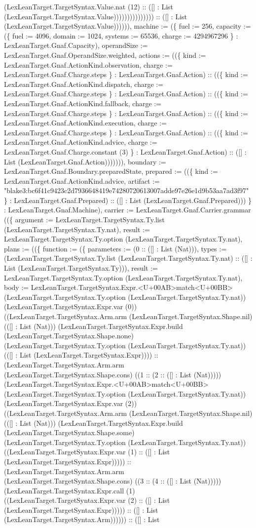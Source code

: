 \documentclass[11pt]{article}
\begin{document}
(LexLeanTarget.TargetSyntax.Value.nat (12) :: ([] : List (LexLeanTarget.TargetSyntax.Value))))))))))))))) :: ([] : List (LexLeanTarget.TargetSyntax.Value)))))), machine := (\{ fuel := 256, capacity := (\{ fuel := 4096, domain := 1024, systems := 65536, charge := 4294967296 \} : LexLeanTarget.Gnaf.Capacity), operandSize := LexLeanTarget.Gnaf.OperandSize.weighted, actions := ((\{ kind := LexLeanTarget.Gnaf.ActionKind.observation, charge := LexLeanTarget.Gnaf.Charge.steps \} : LexLeanTarget.Gnaf.Action) :: ((\{ kind := LexLeanTarget.Gnaf.ActionKind.dispatch, charge := LexLeanTarget.Gnaf.Charge.steps \} : LexLeanTarget.Gnaf.Action) :: ((\{ kind := LexLeanTarget.Gnaf.ActionKind.fallback, charge := LexLeanTarget.Gnaf.Charge.steps \} : LexLeanTarget.Gnaf.Action) :: ((\{ kind := LexLeanTarget.Gnaf.ActionKind.execution, charge := LexLeanTarget.Gnaf.Charge.steps \} : LexLeanTarget.Gnaf.Action) :: ((\{ kind := LexLeanTarget.Gnaf.ActionKind.advice, charge := LexLeanTarget.Gnaf.Charge.constant (3) \} : LexLeanTarget.Gnaf.Action) :: ([] : List (LexLeanTarget.Gnaf.Action))))))), boundary := LexLeanTarget.Gnaf.Boundary.preparedState, prepared := ((\{ kind := LexLeanTarget.Gnaf.ActionKind.advice, artifact := "blake3:bc6f41c9423c2d7936648419e74280720613007adde97e26e1d9b53aa7ad3f97" \} : LexLeanTarget.Gnaf.Prepared) :: ([] : List (LexLeanTarget.Gnaf.Prepared))) \} : LexLeanTarget.Gnaf.Machine), carrier := LexLeanTarget.Gnaf.Carrier.grammar ((\{ argument := LexLeanTarget.TargetSyntax.Ty.list (LexLeanTarget.TargetSyntax.Ty.nat), result := LexLeanTarget.TargetSyntax.Ty.option (LexLeanTarget.TargetSyntax.Ty.nat), plans := ((\{ function := (\{ parameters := (0 :: ([] : List (Nat))), types := (LexLeanTarget.TargetSyntax.Ty.list (LexLeanTarget.TargetSyntax.Ty.nat) :: ([] : List (LexLeanTarget.TargetSyntax.Ty))), result := LexLeanTarget.TargetSyntax.Ty.option (LexLeanTarget.TargetSyntax.Ty.nat), body := LexLeanTarget.TargetSyntax.Expr.<U+00AB>match<U+00BB> (LexLeanTarget.TargetSyntax.Ty.option (LexLeanTarget.TargetSyntax.Ty.nat)) (LexLeanTarget.TargetSyntax.Expr.var (0)) ((LexLeanTarget.TargetSyntax.Arm.arm (LexLeanTarget.TargetSyntax.Shape.nil) (([] : List (Nat))) (LexLeanTarget.TargetSyntax.Expr.build (LexLeanTarget.TargetSyntax.Shape.none) (LexLeanTarget.TargetSyntax.Ty.option (LexLeanTarget.TargetSyntax.Ty.nat)) (([] : List (LexLeanTarget.TargetSyntax.Expr)))) :: (LexLeanTarget.TargetSyntax.Arm.arm (LexLeanTarget.TargetSyntax.Shape.cons) ((1 :: (2 :: ([] : List (Nat))))) (LexLeanTarget.TargetSyntax.Expr.<U+00AB>match<U+00BB> (LexLeanTarget.TargetSyntax.Ty.option (LexLeanTarget.TargetSyntax.Ty.nat)) (LexLeanTarget.TargetSyntax.Expr.var (2)) ((LexLeanTarget.TargetSyntax.Arm.arm (LexLeanTarget.TargetSyntax.Shape.nil) (([] : List (Nat))) (LexLeanTarget.TargetSyntax.Expr.build (LexLeanTarget.TargetSyntax.Shape.some) (LexLeanTarget.TargetSyntax.Ty.option (LexLeanTarget.TargetSyntax.Ty.nat)) ((LexLeanTarget.TargetSyntax.Expr.var (1) :: ([] : List (LexLeanTarget.TargetSyntax.Expr))))) :: (LexLeanTarget.TargetSyntax.Arm.arm (LexLeanTarget.TargetSyntax.Shape.cons) ((3 :: (4 :: ([] : List (Nat))))) (LexLeanTarget.TargetSyntax.Expr.call (1) ((LexLeanTarget.TargetSyntax.Expr.var (2) :: ([] : List (LexLeanTarget.TargetSyntax.Expr))))) :: ([] : List (LexLeanTarget.TargetSyntax.Arm)))))) :: ([] : List 
\end{document}
